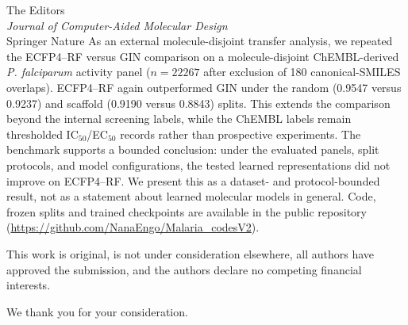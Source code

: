 \documentclass[11pt,a4paper]{letter}
\begin{document}
\begin{letter}{%
  The Editors \\
  \textit{Journal of Computer-Aided Molecular Design} \\
  Springer Nature
}
As an external molecule-disjoint transfer analysis, we repeated the ECFP4--RF versus GIN comparison on a molecule-disjoint ChEMBL-derived \textit{P. falciparum} activity panel ($n=\num{22267}$ after exclusion of \num{180} canonical-SMILES overlaps). ECFP4--RF again outperformed GIN under the random (\num{0.9547} versus \num{0.9237}) and scaffold (\num{0.9190} versus \num{0.8843}) splits. This extends the comparison beyond the internal screening labels, while the ChEMBL labels remain thresholded IC$_{50}$/EC$_{50}$ records rather than prospective experiments. The benchmark supports a bounded conclusion: under the evaluated panels, split protocols, and model configurations, the tested learned representations did not improve on ECFP4--RF. We present this as a dataset- and protocol-bounded result, not as a statement about learned molecular models in general. Code, frozen splits and trained checkpoints are available in the public repository (\url{https://github.com/NanaEngo/Malaria_codesV2}).

This work is original, is not under consideration elsewhere, all authors have approved the submission, and the authors declare no competing financial interests.

\closing{We thank you for your consideration.}



\end{letter}
\end{document}
